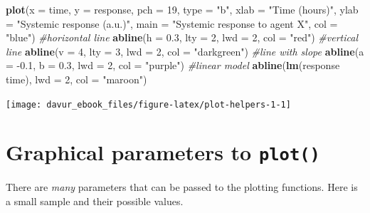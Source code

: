 \documentclass[]{book}
\newenvironment{Shaded}{\begin{snugshade}}{\end{snugshade}}
\newcommand{\CommentTok}[1]{\textcolor[rgb]{0.56,0.35,0.01}{\textit{#1}}}
\newcommand{\DataTypeTok}[1]{\textcolor[rgb]{0.13,0.29,0.53}{#1}}
\newcommand{\DecValTok}[1]{\textcolor[rgb]{0.00,0.00,0.81}{#1}}
\newcommand{\FloatTok}[1]{\textcolor[rgb]{0.00,0.00,0.81}{#1}}
\newcommand{\KeywordTok}[1]{\textcolor[rgb]{0.13,0.29,0.53}{\textbf{#1}}}
\newcommand{\NormalTok}[1]{#1}
\newcommand{\OperatorTok}[1]{\textcolor[rgb]{0.81,0.36,0.00}{\textbf{#1}}}
\newcommand{\StringTok}[1]{\textcolor[rgb]{0.31,0.60,0.02}{#1}}
\begin{document}
\begin{Shaded}
\begin{Highlighting}[]
\KeywordTok{plot}\NormalTok{(}\DataTypeTok{x =}\NormalTok{ time, }\DataTypeTok{y =}\NormalTok{ response, }\DataTypeTok{pch =} \DecValTok{19}\NormalTok{, }\DataTypeTok{type =} \StringTok{"b"}\NormalTok{,}
     \DataTypeTok{xlab =} \StringTok{"Time (hours)"}\NormalTok{, }\DataTypeTok{ylab =} \StringTok{"Systemic response (a.u.)"}\NormalTok{,}
     \DataTypeTok{main =} \StringTok{"Systemic response to agent X"}\NormalTok{, }\DataTypeTok{col =} \StringTok{"blue"}\NormalTok{)}
\CommentTok{#horizontal line}
\KeywordTok{abline}\NormalTok{(}\DataTypeTok{h =} \FloatTok{0.3}\NormalTok{, }\DataTypeTok{lty =} \DecValTok{2}\NormalTok{, }\DataTypeTok{lwd =} \DecValTok{2}\NormalTok{, }\DataTypeTok{col =} \StringTok{"red"}\NormalTok{)}
\CommentTok{#vertical line}
\KeywordTok{abline}\NormalTok{(}\DataTypeTok{v =} \DecValTok{4}\NormalTok{, }\DataTypeTok{lty =} \DecValTok{3}\NormalTok{, }\DataTypeTok{lwd =} \DecValTok{2}\NormalTok{, }\DataTypeTok{col =} \StringTok{"darkgreen"}\NormalTok{)}
\CommentTok{#line with slope}
\KeywordTok{abline}\NormalTok{(}\DataTypeTok{a =} \FloatTok{-0.1}\NormalTok{, }\DataTypeTok{b =} \FloatTok{0.3}\NormalTok{, }\DataTypeTok{lwd =} \DecValTok{2}\NormalTok{, }\DataTypeTok{col =} \StringTok{"purple"}\NormalTok{)}
\CommentTok{#linear model }
\KeywordTok{abline}\NormalTok{(}\KeywordTok{lm}\NormalTok{(response }\OperatorTok{~}\StringTok{ }\NormalTok{time),  }\DataTypeTok{lwd =} \DecValTok{2}\NormalTok{, }\DataTypeTok{col =} \StringTok{"maroon"}\NormalTok{)}
\end{Highlighting}
\end{Shaded}

\begin{center}\texttt{[image: davur\_ebook\_files/figure-latex/plot-helpers-1-1]} \end{center}

\hypertarget{graphical-parameters-to-plot}{%
\section{\texorpdfstring{Graphical parameters to \texttt{plot()}}{Graphical parameters to plot()}}\label{graphical-parameters-to-plot}}

There are \emph{many} parameters that can be passed to the plotting functions. Here is a small sample and their possible values.
\end{document}
